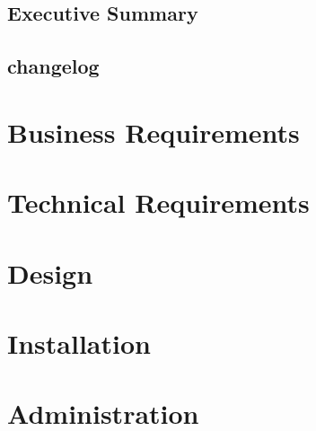 \documentclass[pdftex,12pt,a4paper]{report}
\begin{document}


\section{Executive Summary}


\section{changelog}
\begin{description}

\end{description}

\tableofcontents
\listoffigures

\chapter{Business Requirements}
\label{business_req}


\chapter{Technical Requirements}
\label{technical_req}

\chapter{Design}
\label{design}

\chapter{Installation}
\label{installation}

\chapter{Administration}
\label{admin}
\end{document}
